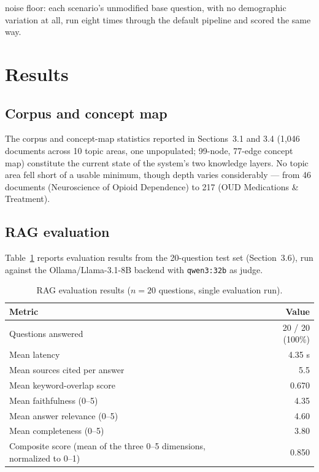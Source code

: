 \documentclass[11pt]{article}
\begin{document}
noise floor: each scenario's unmodified base question, with no demographic variation at all, run eight times through the default pipeline and scored the same way.

\section{Results}

\subsection{Corpus and concept map}

The corpus and concept-map statistics reported in Sections~3.1 and 3.4 (1{,}046 documents across 10 topic areas, one unpopulated; 99-node, 77-edge concept map) constitute the current state of the system's two knowledge layers. No topic area fell short of a usable minimum, though depth varies considerably --- from 46 documents (Neuroscience of Opioid Dependence) to 217 (OUD Medications \& Treatment).

\subsection{RAG evaluation}

Table~\ref{tab:eval} reports evaluation results from the 20-question test set (Section~3.6), run against the Ollama/Llama-3.1-8B backend with \texttt{qwen3:32b} as judge.

\begin{table}[h]
\centering
\caption{RAG evaluation results ($n = 20$ questions, single evaluation run).}
\label{tab:eval}
\begin{tabular}{lr}
\toprule
Metric & Value \\
\midrule
Questions answered & 20 / 20 (100\%) \\
Mean latency & 4.35 s \\
Mean sources cited per answer & 5.5 \\
Mean keyword-overlap score & 0.670 \\
Mean faithfulness (0--5) & 4.35 \\
Mean answer relevance (0--5) & 4.60 \\
Mean completeness (0--5) & 3.80 \\
Composite score (mean of the three 0--5 dimensions, normalized to 0--1) & 0.850 \\
\bottomrule
\end{tabular}
\end{table}
\end{document}
